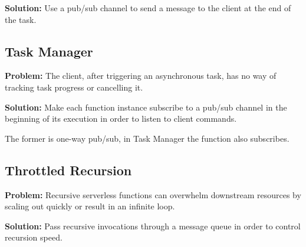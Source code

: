 \textbf{Solution:} Use a pub/sub channel to send a message to the client at the end of the task.

\subsection{Task Manager} \label{subsec:taskManager}

\textbf{Problem:} The client, after triggering an asynchronous task, has no way of tracking task progress or cancelling it.

\textbf{Solution:} Make each function instance subscribe to a pub/sub channel in the beginning of its execution in order to listen to client commands.

The former is one-way pub/sub, in Task Manager the function also subscribes.

\subsection{Throttled Recursion} \label{subsec:throttledRecursion}

\textbf{Problem:} Recursive serverless functions can overwhelm downstream resources by scaling out quickly or result in an infinite loop.

\textbf{Solution:} Pass recursive invocations through a message queue in order to control recursion speed.
